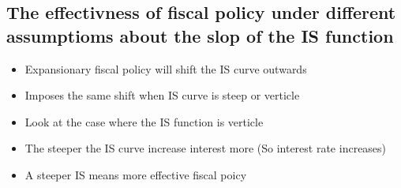 \documentclass[twocolumn]{article}
\providecommand{\tightlist}{%
  \setlength{\itemsep}{0pt}\setlength{\parskip}{0pt}}
\begin{document}
\hypertarget{the-effectivness-of-fiscal-policy-under-different-assumptioms-about-the-slop-of-the-is-function}{%
\subsection{The effectivness of fiscal policy under different
assumptioms about the slop of the IS
function}\label{the-effectivness-of-fiscal-policy-under-different-assumptioms-about-the-slop-of-the-is-function}}

\begin{itemize}
\tightlist
\item
  Expansionary fiscal policy will shift the IS curve outwards
\item
  Imposes the same shift when IS curve is steep or verticle
\item
  Look at the case where the IS function is verticle
\item
  The steeper the IS curve increase interest more (So interest rate
  increases)
\item
  A steeper IS means more effective fiscal poicy
\end{itemize}
\end{document}

